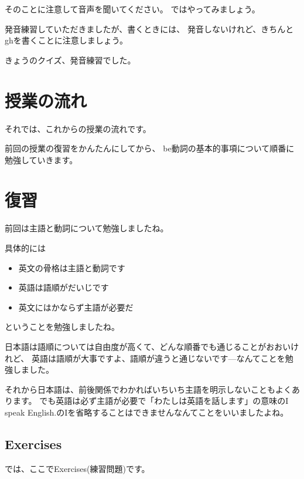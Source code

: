 \documentclass[book,jafontscale=0.9247]{jlreq}
\begin{document}
そのことに注意して音声を聞いてください。
ではやってみましょう。

発音練習していただきましたが、書くときには、
発音しないけれど、きちんとghを書くことに注意しましょう。


きょうのクイズ、発音練習でした。

{\large \ComputerMouse}
\newpage
\section{授業の流れ}

それでは、これからの授業の流れです。

{\large \ComputerMouse}

前回の授業の復習をかんたんにしてから、
be動詞の基本的事項について順番に勉強していきます。

{\large \ComputerMouse}

\newpage
\section*{復習}

前回は主語と動詞について勉強しましたね。

具体的には

{\large \ComputerMouse}

\begin{itemize}
 \item   英文の骨格は主語と動詞です
 \item   英語は語順がだいじです
 \item   英文にはかならず主語が必要だ
\end{itemize}
ということを勉強しましたね。


日本語は語順については自由度が高くて、どんな順番でも通じることがおおいけれど、
英語は語順が大事ですよ、語順が違うと通じないです---なんてことを勉強しました。

それから日本語は、前後関係でわかればいちいち主語を明示しないこともよくあります。
でも英語は必ず主語が必要で「わたしは英語を話します」の意味のI speak English.のIを省略することはできませんなんてことをいいましたよね。
{\large \ComputerMouse}

\subsection*{Exercises}

では、ここでExercises(練習問題)です。
\end{document}
